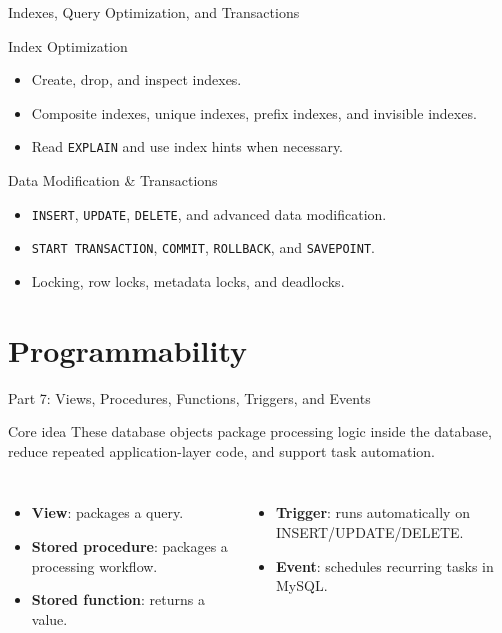 \documentclass[aspectratio=169,11pt]{beamer}
\newcommand{\kw}[1]{\textcolor{dbblue}{\textbf{#1}}}
\begin{document}
\begin{frame}{Indexes, Query Optimization, and Transactions}
\begin{block}{Index Optimization}
\begin{itemize}
  \item Create, drop, and inspect indexes.
  \item Composite indexes, unique indexes, prefix indexes, and invisible indexes.
  \item Read \texttt{EXPLAIN} and use index hints when necessary.
\end{itemize}
\end{block}

\begin{block}{Data Modification \& Transactions}
\begin{itemize}
  \item \texttt{INSERT}, \texttt{UPDATE}, \texttt{DELETE}, and advanced data modification.
  \item \texttt{START TRANSACTION}, \texttt{COMMIT}, \texttt{ROLLBACK}, and \texttt{SAVEPOINT}.
  \item Locking, row locks, metadata locks, and deadlocks.
\end{itemize}
\end{block}
\end{frame}

\section{Programmability}
\begin{frame}{Part 7: Views, Procedures, Functions, Triggers, and Events}
\begin{block}{Core idea}
These database objects package processing logic inside the database, reduce repeated application-layer code, and support task automation.
\end{block}

\begin{columns}[T,onlytextwidth]
\begin{itemize}
  \item \kw{View}: packages a query.
  \item \kw{Stored procedure}: packages a processing workflow.
  \item \kw{Stored function}: returns a value.
\end{itemize}
\begin{itemize}
  \item \kw{Trigger}: runs automatically on INSERT/UPDATE/DELETE.
  \item \kw{Event}: schedules recurring tasks in MySQL.
\end{itemize}
\end{columns}
\end{frame}
\end{document}
